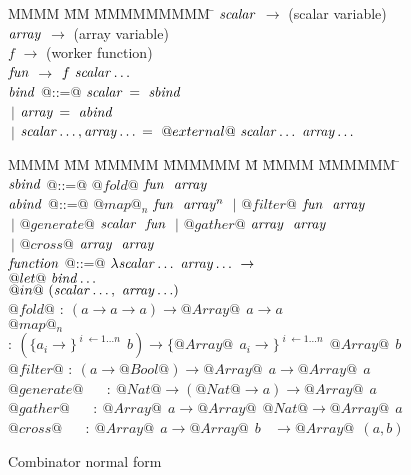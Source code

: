 \begin{figure}
\begin{tabbing}
MMMM        \= MM \= MMMMMMMMM \= \kill
$\mathit{scalar}$    \> $\to$ \> (scalar variable) \\
$\mathit{array}$     \> $\to$ \> (array variable)  \\
$f$         \> $\to$ \> (worker function) \\
$\mathit{fun}$       \> $\to$ \> $f~\mathit{scalar}\ldots$
\\[2ex]
$\mathit{bind}$      \> @::=@ \> $\mathit{scalar}$ \> $=~\mathit{sbind}$ \\
            \> $~|$  \> $\mathit{array}$  \> $=~\mathit{abind}$ \\
            \> $~|$  \> $\mathit{scalar}\ldots,\mathit{array}\ldots$ \> $=~@external@~\mathit{scalar}\ldots~\mathit{array}\ldots$
\end{tabbing}

\begin{tabbing}
MMMM        \= MM \= MMMMM \= MMMMMM \= M \= MMMM \= MMMMMM \= \kill
$\mathit{sbind}$     \> @::=@ \> $@fold@$     \> $\mathit{fun}~~ \mathit{array}$
\\[1ex]

$\mathit{abind}$     \> @::=@ \> $@map@_n$    \> $\mathit{fun}~~ \mathit{array}^n$ 
            \> $~|$  \> $@filter@$   \> $\mathit{fun}~~ \mathit{array}$   \\
            \> $~|$  \> $@generate@$ \> $\mathit{scalar}~~ \mathit{fun}$  
            \> $~|$  \> $@gather@$   \> $\mathit{array}~~ \mathit{array}$ \\
            \> $~|$  \> $@cross@$    \> $\mathit{array}~~ \mathit{array}$
\\[1ex]
$\mathit{function}$  \> @::=@ \> $\lambda \mathit{scalar}\ldots~\mathit{array}\ldots~\to$ \\
            \>          \> $@let@~\mathit{bind}\ldots$                  \\
            \>          \> $@in@~(\mathit{scalar}\ldots,~\mathit{array}\ldots)$
\\[3ex]
$@fold@$     \> $:~ (a \to a \to a) \to @Array@~~ a \to a$     \\
$@map@_n$    \> $:~ (\{a_i          \to\}^{\;i\; \gets 1 \dots n}~~ b)  \to
                       \{@Array@~~ a_i \to\}^{\;i\; \gets 1 \dots n}~~ @Array@~~ b$ \\
$@filter@$   \> $:~ (a \to @Bool@) \to @Array@~~ a \to @Array@~~ a$      \\
$@generate@$ \> ~~ $:~ @Nat@ \to (@Nat@ \to a) \to @Array@~~ a$          \\
$@gather@$   \> ~~ $:~ @Array@~~ a \to @Array@~~ @Nat@  \to @Array@~~ a$ \\
$@cross@$    \> ~~ $:~ @Array@~~ a \to @Array@~~ b ~~~~ \to @Array@~~ (a, b)$
\end{tabbing}
\caption{Combinator normal form}
\label{f:CombinatorNormalForm}
\end{figure}

